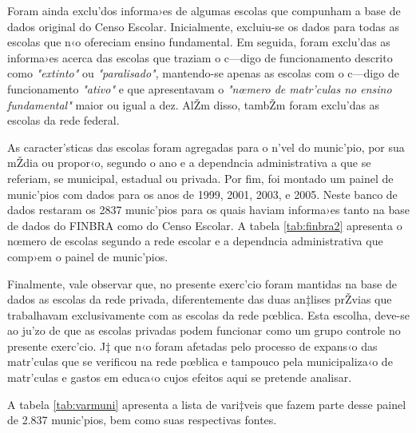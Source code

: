 \documentclass[a4paper, 12pt]{article}
\begin{document}
Foram ainda exclu’dos informa›es de algumas escolas que compunham a base de dados original do Censo Escolar. Inicialmente, excluiu-se os dados para todas as escolas que n‹o ofereciam ensino fundamental. Em seguida, foram exclu’das as informa›es acerca das escolas que traziam o c—digo de funcionamento descrito como \emph{"extinto"} ou \emph{"paralisado"}, mantendo-se apenas as escolas com o c—digo de funcionamento \emph{"ativo"} e que apresentavam o \emph{"nœmero de matr’culas no ensino fundamental"} maior ou igual a dez. AlŽm disso, tambŽm foram exclu’das as escolas da rede federal.

As caracter’sticas das escolas foram agregadas para o n’vel do munic’pio, por sua mŽdia ou propor‹o, segundo o ano e a dependncia administrativa a que se referiam, se municipal, estadual ou privada. Por fim, foi montado um painel de munic’pios com dados para os anos de 1999, 2001, 2003, e 2005. Neste banco de dados restaram os 2837 munic’pios para os quais haviam informa›es tanto na base de dados do FINBRA como do Censo Escolar. A tabela \ref{tab:finbra2} apresenta o nœmero de escolas segundo a rede escolar e a dependncia administrativa que comp›em o painel de munic’pios.


Finalmente, vale observar que, no presente exerc’cio foram mantidas na base de dados as escolas da rede privada, diferentemente das duas an‡lises prŽvias que trabalhavam exclusivamente com as escolas da rede pœblica. Esta escolha, deve-se ao ju’zo de que as escolas privadas podem funcionar como um grupo controle  no presente exerc’cio. J‡ que n‹o foram afetadas pelo processo de expans‹o das matr’culas que se verificou na rede pœblica e tampouco pela municipaliza‹o de matr’culas e gastos em educa‹o cujos efeitos aqui se pretende analisar.
 
A tabela \ref{tab:varmuni} apresenta a lista de vari‡veis que fazem parte desse painel de 2.837 munic’pios, bem como suas respectivas fontes. 


\end{document}
